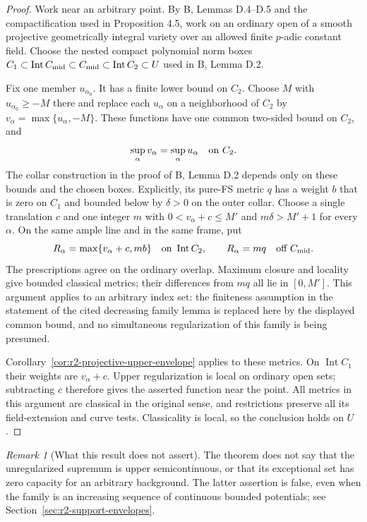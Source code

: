 \documentclass[11pt,a4paper]{article}
\numberwithin{equation}{section}
\theoremstyle{definition}
\theoremstyle{remark}
\newtheorem{remark}[theorem]{Remark}
\begin{document}
\begin{proof}
Work near an arbitrary point. By \textup{B}, Lemmas D.4--D.5 and the
compactification used in Proposition 4.5, work on an ordinary open
of a smooth projective geometrically integral variety over an allowed
finite $p$-adic constant field. Choose the nested compact polynomial
norm boxes $C_1\subset\operatorname{Int}C_{\rm mid}
\subset C_{\rm mid}\subset\operatorname{Int}C_2\subset U$ used
in \textup{B}, Lemma D.2.

Fix one member $u_{\alpha_0}$. It has a finite lower bound on $C_2$.
Choose $M$ with $u_{\alpha_0}\geq-M$ there and replace each
$u_\alpha$ on a neighborhood of $C_2$ by
$v_\alpha=\max\{u_\alpha,-M\}$. These functions have one common
two-sided bound on $C_2$, and
\[
 \sup_\alpha v_\alpha=\sup_\alpha u_\alpha\quad\hbox{on }C_2.
\]
The collar construction in the proof of \textup{B}, Lemma D.2
depends only on these bounds and the chosen boxes. Explicitly, its
pure-FS metric $q$ has a weight $b$ that is zero on $C_1$ and bounded
below by $\delta>0$ on the outer collar. Choose a single translation
$c$ and one integer $m$ with
$0<v_\alpha+c\leq M'$ and $m\delta>M'+1$ for every $\alpha$.
On the same ample line and in the same frame, put
\[
 R_\alpha=\max\{v_\alpha+c,mb\}
       \quad\hbox{on }\operatorname{Int}C_2,
 \qquad R_\alpha=mq\quad\hbox{off }C_{\rm mid}.
\]
The prescriptions agree on the ordinary overlap. Maximum closure and
locality give bounded classical metrics; their differences from $mq$
all lie in $[0,M']$. This argument applies to an arbitrary index set:
the finiteness assumption in the statement of the cited decreasing
family lemma is replaced here by the displayed common bound, and no
simultaneous regularization of this family is being presumed.

Corollary~\ref{cor:r2-projective-upper-envelope} applies to these
metrics. On $\operatorname{Int}C_1$ their weights are
$v_\alpha+c$. Upper regularization is local on ordinary open sets;
subtracting $c$ therefore gives the asserted function near the point.
All metrics in this argument are classical in the original sense,
and restrictions preserve all its field-extension and curve tests.
Classicality is local, so the conclusion holds on $U$.
\end{proof}

\begin{remark}[What this result does not assert]
The theorem does not say that the unregularized supremum is upper
semicontinuous, or that its exceptional set has zero capacity for an
arbitrary background. The latter assertion is false, even when the
family is an increasing sequence of continuous bounded potentials;
see Section~\ref{sec:r2-support-envelopes}.
\end{remark}
\end{document}
